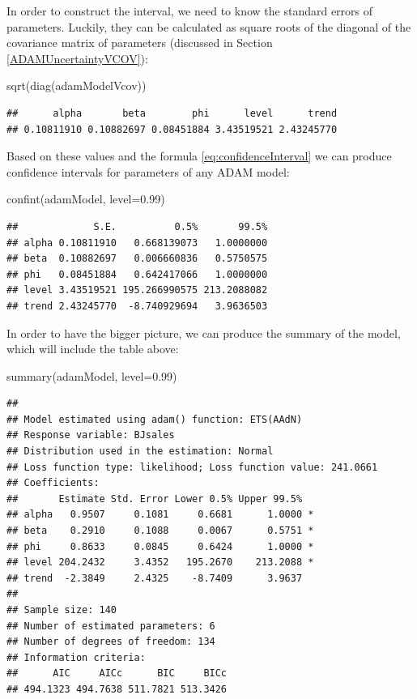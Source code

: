 \documentclass[
]{book}
\newenvironment{Shaded}{\begin{snugshade}}{\end{snugshade}}
\newcommand{\AttributeTok}[1]{\textcolor[rgb]{0.77,0.63,0.00}{#1}}
\newcommand{\FloatTok}[1]{\textcolor[rgb]{0.00,0.00,0.81}{#1}}
\newcommand{\FunctionTok}[1]{\textcolor[rgb]{0.00,0.00,0.00}{#1}}
\newcommand{\NormalTok}[1]{#1}
\theoremstyle{definition}
\theoremstyle{definition}
\theoremstyle{definition}
\theoremstyle{definition}
\theoremstyle{remark}
\begin{document}
In order to construct the interval, we need to know the standard errors of parameters. Luckily, they can be calculated as square roots of the diagonal of the covariance matrix of parameters (discussed in Section \ref{ADAMUncertaintyVCOV}):

\begin{Shaded}
\begin{Highlighting}[]
\FunctionTok{sqrt}\NormalTok{(}\FunctionTok{diag}\NormalTok{(adamModelVcov))}
\end{Highlighting}
\end{Shaded}

\begin{verbatim}
##      alpha       beta        phi      level      trend 
## 0.10811910 0.10882697 0.08451884 3.43519521 2.43245770
\end{verbatim}

Based on these values and the formula \eqref{eq:confidenceInterval} we can produce confidence intervals for parameters of any ADAM model:

\begin{Shaded}
\begin{Highlighting}[]
\FunctionTok{confint}\NormalTok{(adamModel, }\AttributeTok{level=}\FloatTok{0.99}\NormalTok{)}
\end{Highlighting}
\end{Shaded}

\begin{verbatim}
##             S.E.          0.5%       99.5%
## alpha 0.10811910   0.668139073   1.0000000
## beta  0.10882697   0.006660836   0.5750575
## phi   0.08451884   0.642417066   1.0000000
## level 3.43519521 195.266990575 213.2088082
## trend 2.43245770  -8.740929694   3.9636503
\end{verbatim}

In order to have the bigger picture, we can produce the summary of the model, which will include the table above:

\begin{Shaded}
\begin{Highlighting}[]
\FunctionTok{summary}\NormalTok{(adamModel, }\AttributeTok{level=}\FloatTok{0.99}\NormalTok{)}
\end{Highlighting}
\end{Shaded}

\begin{verbatim}
## 
## Model estimated using adam() function: ETS(AAdN)
## Response variable: BJsales
## Distribution used in the estimation: Normal
## Loss function type: likelihood; Loss function value: 241.0661
## Coefficients:
##       Estimate Std. Error Lower 0.5% Upper 99.5%  
## alpha   0.9507     0.1081     0.6681      1.0000 *
## beta    0.2910     0.1088     0.0067      0.5751 *
## phi     0.8633     0.0845     0.6424      1.0000 *
## level 204.2432     3.4352   195.2670    213.2088 *
## trend  -2.3849     2.4325    -8.7409      3.9637  
## 
## Sample size: 140
## Number of estimated parameters: 6
## Number of degrees of freedom: 134
## Information criteria:
##      AIC     AICc      BIC     BICc 
## 494.1323 494.7638 511.7821 513.3426
\end{verbatim}
\end{document}
